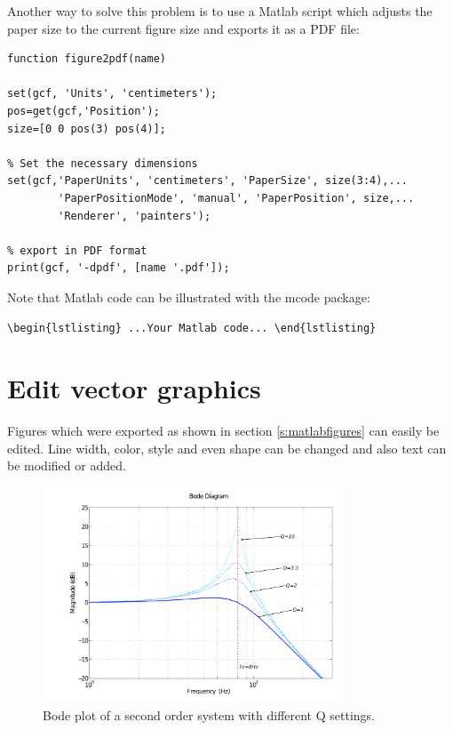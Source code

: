Another way to solve this problem is to use a Matlab script which adjusts the paper size to the current figure size and exports it as a PDF file:

\begin{lstlisting}
function figure2pdf(name)

set(gcf, 'Units', 'centimeters');
pos=get(gcf,'Position');
size=[0 0 pos(3) pos(4)];

% Set the necessary dimensions
set(gcf,'PaperUnits', 'centimeters', 'PaperSize', size(3:4),...
        'PaperPositionMode', 'manual', 'PaperPosition', size,...
        'Renderer', 'painters');
        
% export in PDF format
print(gcf, '-dpdf', [name '.pdf']);
\end{lstlisting}


Note that Matlab code can be illustrated with the mcode package:

\begin{verbatim}
\begin{lstlisting} ...Your Matlab code... \end{lstlisting}
\end{verbatim}


\section{Edit vector graphics}\label{s:editgraphics}
Figures which were exported as shown in section \ref{s:matlabfigures} can easily be edited. Line width, color, style and even shape can be changed and also text can be modified or added.

\begin{figure}[h]
   \centering
   \includegraphics[width=0.8\textwidth]{pics/secondorder_edit.pdf}
   \caption{Bode plot of a second order system with different Q settings.}
   \label{p:secondorder}
\end{figure}

